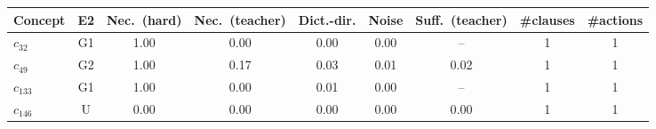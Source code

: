 \begin{tabular}{lcccccccc}
\toprule
Concept & E2 & Nec.\ (hard) & Nec.\ (teacher) & Dict.-dir. & Noise & Suff.\ (teacher) & \#clauses & \#actions \\
\midrule
$c_{32}$ & G1 & 1.00 & 0.00 & 0.00 & 0.00 & -- & 1 & 1 \\
$c_{49}$ & G2 & 1.00 & 0.17 & 0.03 & 0.01 & 0.02 & 1 & 1 \\
$c_{133}$ & G1 & 1.00 & 0.00 & 0.01 & 0.00 & -- & 1 & 1 \\
$c_{146}$ & U & 0.00 & 0.00 & 0.00 & 0.00 & 0.00 & 1 & 1 \\
\bottomrule
\end{tabular}